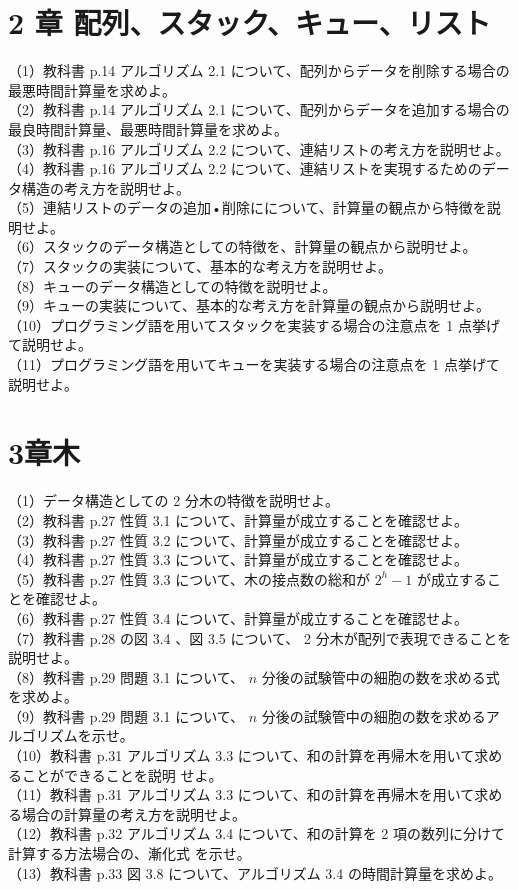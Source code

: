 \documentclass[dvipdfmx]{jreport}
\begin{document}
\section*{2 章 配列、スタック、キュー、リスト}
（1）教科書 p.14 アルゴリズム 2.1 について、配列からデータを削除する場合の最悪時間計算量を求めよ。\\
（2）教科書 p.14 アルゴリズム 2.1 について、配列からデータを追加する場合の最良時間計算量、最悪時間計算量を求めよ。\\
（3）教科書 p.16 アルゴリズム 2.2 について、連結リストの考え方を説明せよ。\\
（4）教科書 p.16 アルゴリズム 2.2 について、連結リストを実現するためのデータ構造の考え方を説明せよ。\\
（5）連結リストのデータの追加•削除にについて、計算量の観点から特徴を説明せよ。\\
（6）スタックのデータ構造としての特徴を、計算量の観点から説明せよ。\\
（7）スタックの実装について、基本的な考え方を説明せよ。\\
（8）キューのデータ構造としての特徴を説明せよ。\\
（9）キューの実装について、基本的な考え方を計算量の観点から説明せよ。\\
（10）プログラミング語を用いてスタックを実装する場合の注意点を 1 点挙げて説明せよ。\\
（11）プログラミング語を用いてキューを実装する場合の注意点を 1 点挙げて説明せよ。

\section*{3章木}
（1）データ構造としての 2 分木の特徴を説明せよ。\\
（2）教科書 p.27 性質 3.1 について、計算量が成立することを確認せよ。\\
（3）教科書 p.27 性質 3.2 について、計算量が成立することを確認せよ。\\
（4）教科書 p.27 性質 3.3 について、計算量が成立することを確認せよ。\\
（5）教科書 p.27 性質 3.3 について、木の接点数の総和が $2^{h}-1$ が成立することを確認せよ。\\
（6）教科書 p.27 性質 3.4 について、計算量が成立することを確認せよ。\\
（7）教科書 p.28 の図 3.4 、図 3.5 について、 2 分木が配列で表現できることを説明せよ。\\
（8）教科書 p.29 問題 3.1 について、 $n$ 分後の試験管中の細胞の数を求める式を求めよ。\\
（9）教科書 p.29 問題 3.1 について、 $n$ 分後の試験管中の細胞の数を求めるアルゴリズムを示せ。\\
（10）教科書 p.31 アルゴリズム 3.3 について、和の計算を再帰木を用いて求めることができることを説明 せよ。\\
（11）教科書 p.31 アルゴリズム 3.3 について、和の計算を再帰木を用いて求める場合の計算量の考え方を説明せよ。\\
（12）教科書 p.32 アルゴリズム 3.4 について、和の計算を 2 項の数列に分けて計算する方法場合の、漸化式 を示せ。\\
（13）教科書 p.33 図 3.8 について、アルゴリズム 3.4 の時間計算量を求めよ。
\end{document}
